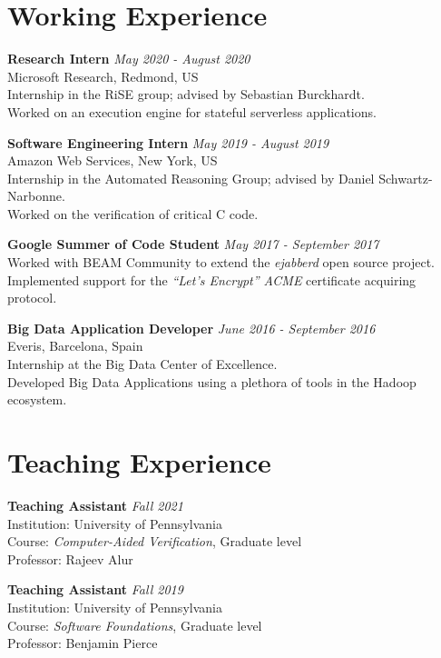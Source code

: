 \documentclass[margin]{res}
\begin{document}
\begin{resume}
\section{Working Experience}

\textbf{Research Intern}  \hfill {\em May 2020 - August 2020} \\
Microsoft Research, Redmond, US \\
Internship in the RiSE group; advised by Sebastian Burckhardt. \\
Worked on an execution engine for stateful serverless applications.

\textbf{Software Engineering Intern}  \hfill {\em May 2019 - August 2019} \\
Amazon Web Services, New York, US \\
Internship in the Automated Reasoning Group; advised by Daniel Schwartz-Narbonne. \\
Worked on the verification of critical C code.

\textbf{Google Summer of Code Student}  \hfill {\em May 2017 - September 2017} \\
Worked with BEAM Community to extend the \textit{ejabberd} open source project. \\
Implemented support for the \textit{``Let's Encrypt'' ACME} certificate acquiring protocol.

\textbf{Big Data Application Developer}  \hfill {\em June 2016 - September 2016} \\
Everis, Barcelona, Spain \\
Internship at the Big Data Center of Excellence. \\
Developed Big Data Applications using a plethora of tools in the Hadoop ecosystem.




\section{Teaching Experience}

\textbf{Teaching Assistant}  \hfill {\em Fall 2021} \\
Institution: University of Pennsylvania \\
Course: \textit{Computer-Aided Verification}, Graduate level \\
Professor: Rajeev Alur

\textbf{Teaching Assistant}  \hfill {\em Fall 2019} \\
Institution: University of Pennsylvania \\
Course: \textit{Software Foundations}, Graduate level \\
Professor: Benjamin Pierce


\end{resume}
\end{document}
